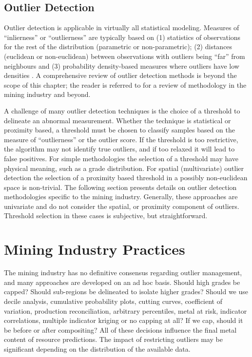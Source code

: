 \FloatBarrier
\subsection{Outlier Detection}
\label{subsec:02dectection}

Outlier detection is applicable in virtually all statistical modeling. Measures of ``inlierness'' or ``outlierness'' are typically based on (1) statistics of observations for the rest of the distribution (parametric or non-parametric); (2) distances (euclidean or non-euclidean) between observations with outliers being ``far'' from neighbours and (3) probability density-based measures where outliers have low densities \citep{li2022ecod}. A comprehensive review of outlier detection methods is beyond the scope of this chapter; the reader is referred to \cite{aggarwal2016outlier,pang2022deep,hodge2004survey,wang2019progress,nowak2019optimal,leuangthong2015dealing} for a review of methodology in the mining industry and beyond.

A challenge of many outlier detection techniques is the choice of a threshold to delineate an abnormal measurement. Whether the technique is statistical or proximity based, a threshold must be chosen to classify samples based on the measure of ``outlierness'' or the outlier score. If the threshold is too restrictive, the algorithm may not identify true outliers, and if too relaxed it will lead to false positives. For simple methodologies the selection of a threshold may have physical meaning, such as a grade distribution. For spatial (multivariate) outlier detection the selection of a proximity based threshold in a possibly non-euclidean space is non-trivial. The following section presents details on outlier detection methodologies specific to the mining industry. Generally, these approaches are univariate and do not consider the spatial, or proximity component of outliers. Threshold selection in these cases is subjective, but straightforward.

\FloatBarrier
\section{Mining Industry Practices}
\label{sec:02industry}

The mining industry has no definitive consensus regarding outlier management, and many approaches are developed on an ad hoc basis. Should high grades be capped? Should sub-regions be delineated to isolate higher grades? Should we use decile analysis, cumulative probability plots, cutting curves, coefficient of variation, production reconciliation, arbitrary percentiles, metal at risk, indicator correlations, multiple indicator kriging or no capping at all? If we cap, should it be before or after compositing? All of these decisions influence the final metal content of resource predictions. The impact of restricting outliers may be significant depending on the distribution of the available data.

